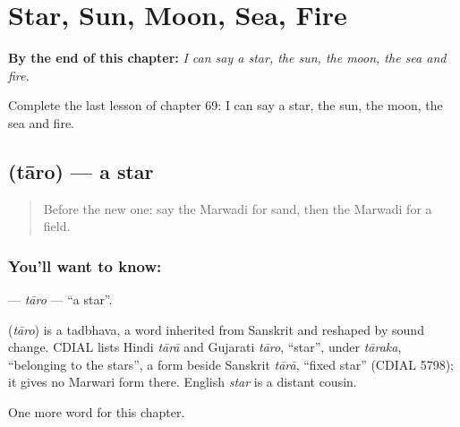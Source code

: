 
\chapter{Star, Sun, Moon, Sea, Fire}
\label{ch:mw-star-sun-moon-sea-fire}

\begin{chapteropening}
\textbf{By the end of this chapter:} \emph{I can say a star, the sun, the moon, the sea and fire.}

Complete the last lesson of chapter 69: I can say a star, the sun, the moon, the sea and fire.
\end{chapteropening}

\section[\texorpdfstring{\mw{तारो} (tāro)}{तारो (tāro)}]{ (tāro) — a star}

\label{lesson:MW-C69-taro}



\begin{quote}
Before the new one: say the Marwadi for sand, then the Marwadi for a field.
\end{quote}

\subsection*{You'll want to know: }
\textbf{} — \emph{tāro} — \textquotedblleft{}a star\textquotedblright{}.

\begin{cousinweb}
\textbf{} (\emph{tāro}) is a tadbhava, a word inherited from Sanskrit and reshaped by sound change. CDIAL lists Hindi \emph{tārā} and Gujarati \emph{tāro}, \textquotedblleft{}star\textquotedblright{}, under \emph{tāraka}, \textquotedblleft{}belonging to the stars\textquotedblright{}, a form beside Sanskrit \emph{tārā}, \textquotedblleft{}fixed star\textquotedblright{} (CDIAL 5798); it gives no Marwari form there. English \emph{star} is a distant cousin.
\end{cousinweb}

\begin{grammarlens}[title={What you've built}]
One more word for this chapter.
\end{grammarlens}

